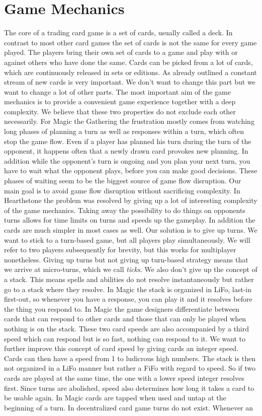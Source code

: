 \documentclass{article}
\begin{document}
\section{Game Mechanics}
%
The core of a trading card game is a set of cards, usually called a deck. In contrast to most other card games the set of cards is not the same for every game played. The players bring their own set of cards to a game and play with or against others who have done the same. Cards can be picked from a lot of cards, which are continuously released in sets or editions. As already outlined a constant stream of new cards is very important. We don't want to change this part but we want to change a lot of other parts. The most important aim of the game mechanics is to provide a convenient game experience together with a deep complexity. We believe that these two properties do not exclude each other necessarily. For Magic the Gathering the frustration mostly comes from watching long phases of planning a turn as well as responses within a turn, which often stop the game flow. Even if a player has planned his turn during the turn of the opponent, it happens often that a newly drawn card provokes new planning. In addition while the opponent's turn is ongoing and you plan your next turn, you have to wait what the opponent plays, before you can make good decisions. These phases of waiting seem to be the biggest source of game flow disruption. Our main goal is to avoid game flow disruption without sacrificing complexity. In Hearthstone the problem was resolved by giving up a lot of interesting complexity of the game mechanics. Taking away the possibility to do things on opponents turns allows for time limits on turns and speeds up the gameplay. In addition the cards are much simpler in most cases as well. Our solution is to give up turns. We want to stick to a turn-based game, but all players play simultaneously. We will refer to two players subsequently for brevity, but this works for multiplayer nonetheless. Giving up turns but not giving up turn-based strategy means that we arrive at micro-turns, which we call \textit{ticks}. We also don't give up the concept of a stack. This means spells and abilities do not resolve instantaneously but rather go to a stack where they resolve. In Magic the stack is organized in LiFo, last-in first-out, so whenever you have a response, you can play it and it resolves before the thing you respond to. In Magic the game designers differentiate between cards that can respond to other cards and those that can only be played when nothing is on the stack. These two card speeds are also accompanied by a third speed which can respond but is so fast, nothing can respond to it. We want to further improve this concept of card speed by giving cards an integer speed. Cards can then have a speed from 1 to ludicrous high numbers. The stack is then not organized in a LiFo manner but rather a FiFo with regard to speed. So if two cards are played at the same time, the one with a lower speed integer resolves first. Since turns are abolished, speed also determines how long it takes a card to be usable again. In Magic cards are tapped when used and untap at the beginning of a turn. In decentralized card game turns do not exist. Whenever an 
\end{document}
